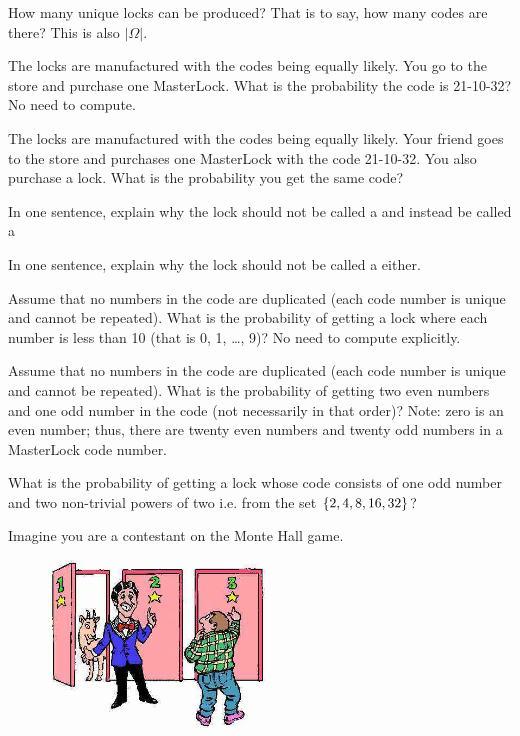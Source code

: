 \documentclass[12pt]{article}
\begin{document}
 How many unique locks can be produced? That is to say, how many codes are there? This is also $|\Omega|$.

 The locks are manufactured with the codes being equally likely. You go to the store and purchase one MasterLock. What is the probability the code is 21-10-32? No need to compute. 

 The locks are manufactured with the codes being equally likely. Your friend goes to the store and purchases one MasterLock with the code 21-10-32. You also purchase a lock. What is the probability you get the same code? 


 In one sentence, explain why the lock should not be called a  and instead be called a 

 In one sentence, explain why the lock should not be called a  either.

 Assume that no numbers in the code are duplicated (each code number is unique and cannot be repeated). What is the probability of getting a lock where each number is less than 10 (that is 0, 1, \ldots, 9)? No need to compute explicitly.


 Assume that no numbers in the code are duplicated (each code number is unique and cannot be repeated). What is the probability of getting two even numbers and one odd number in the code (not necessarily in that order)? Note: zero is an even number; thus, there are twenty even numbers and twenty odd numbers in a MasterLock code number. 


 What is the probability of getting a lock whose code consists of one odd number and two non-trivial powers of two i.e. from the set $\left\{2, 4, 8, 16, 32\right\}$? 


\eenum

\problem Imagine you are a contestant on the Monte Hall game. 

\begin{figure}[htp]
\centering
\includegraphics[width=2.3in]{montehall.jpg}
\end{figure}
\end{document}
